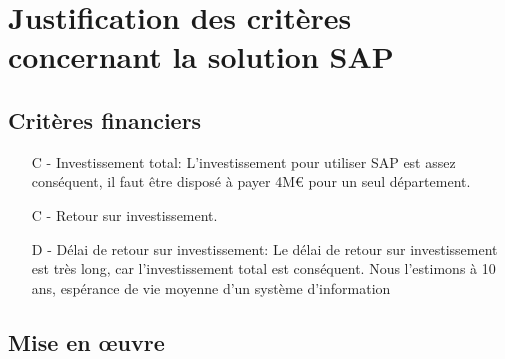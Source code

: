 \section{Justification des critères concernant la solution SAP}

\subsection{Critères financiers}

\begin{itemize}
\item [C -] Investissement total:\el
	L'investissement pour utiliser SAP est assez conséquent,
    il faut être disposé à payer 4M€ pour un seul département.
	
\item [C -] Retour sur investissement.
		
\item [D -] Délai de retour sur investissement:\el
	Le délai de retour sur investissement est très long,
    car l'investissement total est conséquent. Nous l'estimons à 10 ans, espérance
de vie moyenne d'un système d'information
\end{itemize}

\subsection{Mise en \oe{}uvre}

